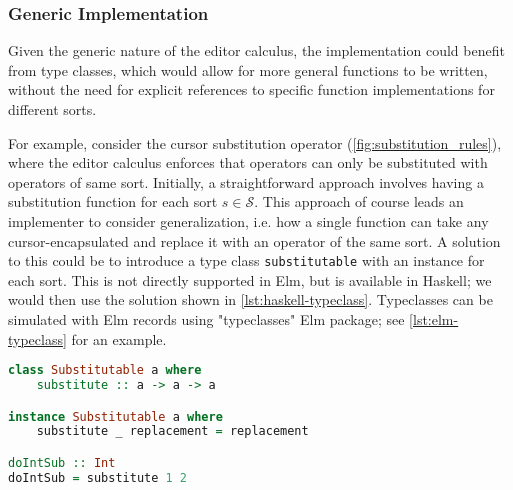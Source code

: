 \documentclass[sigplan,screen]{acmart}
\begin{document}

\subsubsection{Generic Implementation}
Given the generic nature of the editor calculus, the implementation could
benefit from type classes, which would allow for more general functions
to be written, without the need for explicit references to specific
function implementations for different sorts.

For example, consider the cursor substitution operator
(\cref{fig:substitution_rules}), where the editor calculus enforces
that operators can only be substituted with operators of same
sort. Initially, a straightforward approach involves having a
substitution function for each sort $s \in \mathcal{S}$.  This
approach of course leads an implementer to consider generalization,
i.e. how a single function can take any cursor-encapsulated \abt and
replace it with an operator of the same sort. A solution to this could
be to introduce a type class 
\texttt{substitutable} with an instance for each sort. This is
not directly supported in Elm, but is available in Haskell; we would then use the
solution shown in \cref{lst:haskell-typeclass}.  Typeclasses can
be simulated with Elm records using "typeclasses"
Elm package\cite{elm-typeclass-package}; see 
\cref{lst:elm-typeclass} for an example.  %


\begin{lstlisting}[language=Haskell,style=inline,caption={Haskell typeclass example},label={lst:haskell-typeclass}]
class Substitutable a where
    substitute :: a -> a -> a

instance Substitutable a where
    substitute _ replacement = replacement

doIntSub :: Int
doIntSub = substitute 1 2
\end{lstlisting}
\end{document}
